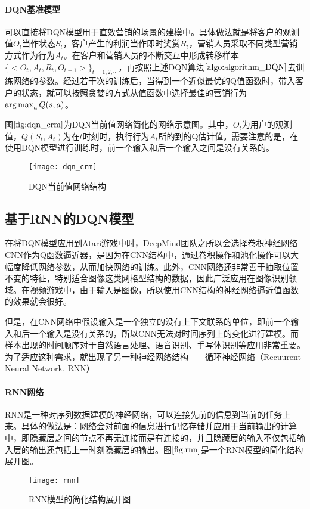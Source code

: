 \paragraph{DQN基准模型}
可以直接将DQN模型用于直效营销的场景的建模中。具体做法就是将客户的观测值$O_{t}$当作状态$S_{t}$，客户产生的利润当作即时奖赏$R_{t}$，营销人员采取不同类型营销方式作为行为$A_{t}$。在客户和营销人员的不断交互中形成转移样本$\{<O_{t}, A_{t}, R_{t}, O_{t+1}>\}_{t=1,2,\cdots}$，再按照上述DQN算法$\ref{algo:algorithm_DQN}$去训练网络的参数。经过若干次的训练后，当得到一个近似最优的Q值函数时，带入客户的状态，就可以按照贪婪的方式从值函数中选择最佳的营销行为$\operatorname*{arg\,max}_{a}Q(s,a)$。

图$\ref{fig:dqn_crm}$为DQN当前值网络简化的网络示意图。其中，$O_{t}$为用户的观测值，$Q(S_{t},A_{t})$为在$t$时刻时，执行行为$A_{t}$所的到的Q估计值。需要注意的是，在使用DQN模型进行训练时，前一个输入和后一个输入之间是没有关系的。
\begin{figure}[htbp]
\centering
\texttt{[image: dqn\_crm]}
\caption{DQN当前值网络结构}
\label{fig:dqn_crm}
\end{figure}

\subsection{基于RNN的DQN模型}
在将DQN模型应用到Atari游戏中时\citep{mnih2013playing}，DeepMind团队之所以会选择卷积神经网络CNN作为Q函数逼近器，是因为在CNN结构中，通过卷积操作和池化操作可以大幅度降低网络参数，从而加快网络的训练。此外，CNN网络还非常善于抽取位置不变的特征，特别适合图像这类网格型结构的数据，因此广泛应用在图像识别领域。在视频游戏中，由于输入是图像，所以使用CNN结构的神经网络逼近值函数的效果就会很好。

但是，在CNN网络中假设输入是一个独立的没有上下文联系的单位，即前一个输入和后一个输入是没有关系的，所以CNN无法对时间序列上的变化进行建模。而样本出现的时间顺序对于自然语言处理、语音识别、手写体识别等应用非常重要。为了适应这种需求，就出现了另一种神经网络结构——循环神经网络（Recuurent Neural Network, RNN）

 \paragraph{RNN网络}
RNN是一种对序列数据建模的神经网络，可以连接先前的信息到当前的任务上来。具体的做法是：网络会对前面的信息进行记忆存储并应用于当前输出的计算中，即隐藏层之间的节点不再无连接而是有连接的，并且隐藏层的输入不仅包括输入层的输出还包括上一时刻隐藏层的输出。图$\ref{fig:rnn}$是一个RNN模型的简化结构展开图。
\begin{figure}[htbp]
\centering
\texttt{[image: rnn]}
\caption{RNN模型的简化结构展开图}
\label{fig:rnn}
\end{figure}

